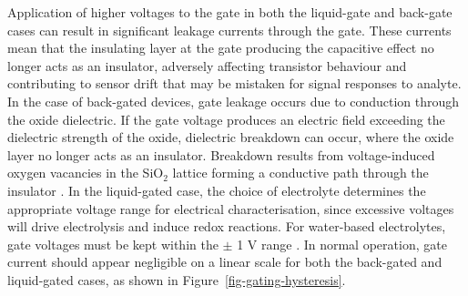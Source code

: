 \documentclass[
  a4paper,
]{scrbook}
\begin{document}
Application of higher voltages to the gate in both the liquid-gate and
back-gate cases can result in significant leakage currents through the
gate. These currents mean that the insulating layer at the gate
producing the capacitive effect no longer acts as an insulator,
adversely affecting transistor behaviour and contributing to sensor
drift that may be mistaken for signal responses to
analyte\autocite{Noyce2019,Shkodra2021,Albarghouthi2022}. In the case of
back-gated devices, gate leakage occurs due to conduction through the
oxide dielectric. If the gate voltage produces an electric field
exceeding the dielectric strength of the oxide, dielectric breakdown can
occur, where the oxide layer no longer acts as an insulator. Breakdown
results from voltage-induced oxygen vacancies in the SiO\(_2\) lattice
forming a conductive path through the insulator \autocite{Padovani2017}.
In the liquid-gated case, the choice of electrolyte determines the
appropriate voltage range for electrical characterisation, since
excessive voltages will drive electrolysis and induce redox reactions.
For water-based electrolytes, gate voltages must be kept within the
\(\pm\) 1 V range \autocite{Wang2010,Ohno2015,Shkodra2021}. In normal
operation, gate current should appear negligible on a linear scale for
both the back-gated and liquid-gated cases, as shown in
Figure~\ref{fig-gating-hysteresis}.
\end{document}
